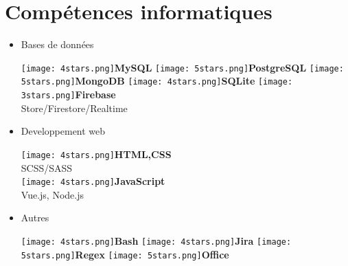 \documentclass[]{friggeri-cv}
\begin{document}
\section{Compétences informatiques}
        \vspace*{-0.45cm}
        \setlength{\columnsep}{-0.3cm}
        \begin{flushleft}
        \begin{multicols}{3}
		\begin{itemize}
		
		\setlength{\itemsep}{5pt}
  		\setlength{\parskip}{0pt}
  		\setlength{\parsep}{0pt}
          
        
\item \large Bases de données \
\normalsize
\begin{flushleft}

\texttt{[image: 4stars.png]}\hspace{1.5mm}\textbf{MySQL}
\texttt{[image: 5stars.png]}\hspace{1.5mm}\textbf{PostgreSQL}
\texttt{[image: 5stars.png]}\hspace{1.5mm}\textbf{MongoDB}
\texttt{[image: 4stars.png]}\hspace{1.5mm}\textbf{SQLite}
\texttt{[image: 3stars.png]}\hspace{1.5mm}\textbf{Firebase}\\Store/Firestore/Realtime\\
\end{flushleft}            

\item \large Developpement web \
\normalsize
\begin{flushleft}

\texttt{[image: 4stars.png]}\hspace{1.5mm}\textbf{HTML,CSS}\\SCSS/SASS\\
\texttt{[image: 4stars.png]}\hspace{1.5mm}\textbf{JavaScript}\\Vue.js, Node.js\\
\end{flushleft}            

\item \large Autres \
\normalsize
\begin{flushleft}

\texttt{[image: 4stars.png]}\hspace{1.5mm}\textbf{Bash}
\texttt{[image: 4stars.png]}\hspace{1.5mm}\textbf{Jira}
\texttt{[image: 5stars.png]}\hspace{1.5mm}\textbf{Regex}
\texttt{[image: 5stars.png]}\hspace{1.5mm}\textbf{Office}
\end{flushleft}            


\end{itemize}
\end{multicols}
\end{flushleft}
\end{document}
